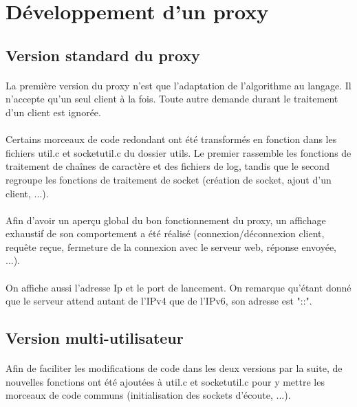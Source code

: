 \section{Développement d'un proxy}

\subsection{Version standard du proxy}

\paragraph{}
La première version du proxy n'est que l'adaptation de l'algorithme au langage. Il n'accepte qu'un seul client à la fois. Toute autre demande durant le traitement d'un client est ignorée. 
\paragraph{}
Certains morceaux de code redondant ont été transformés en fonction dans les fichiers util.c et socketutil.c du dossier utils. Le premier rassemble les fonctions de traitement de chaînes de caractère et des fichiers de log, tandis que le second regroupe les fonctions de traitement de socket (création de socket, ajout d'un client, ...).
\paragraph{}
Afin d'avoir un aperçu global du bon fonctionnement du proxy, un affichage exhaustif de son comportement a été réalisé (connexion/déconnexion client, requête reçue, fermeture de la connexion avec le serveur web, réponse envoyée, ...). 
\paragraph{}
On affiche aussi l'adresse Ip et le port de lancement. On remarque qu'étant donné que le serveur attend autant de l'IPv4 que de l'IPv6, son adresse est "::". 

\subsection{Version multi-utilisateur}
\paragraph{}
Afin de faciliter les modifications de code dans les deux versions par la suite, de nouvelles fonctions ont été ajoutées à util.c et socketutil.c pour y mettre les morceaux de code communs (initialisation des sockets d'écoute, ...).
